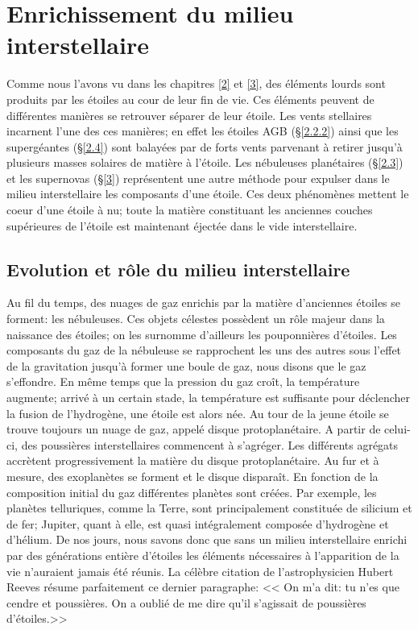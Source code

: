 
\chapterFormats

\chapter{Enrichissement du milieu interstellaire}\label{5}

\chapterFormat

Comme nous l'avons vu dans les chapitres \ref{2} et \ref{3}, des éléments lourds sont produits par les étoiles au cour de leur fin de vie. Ces éléments peuvent de différentes manières se retrouver séparer de leur étoile. Les vents stellaires incarnent l'une des ces manières; en effet les étoiles AGB (§\ref{2.2.2}) ainsi que les supergéantes (§\ref{2.4}) sont balayées par de forts vents parvenant à retirer jusqu'à plusieurs masses solaires de matière à l'étoile. Les nébuleuses planétaires (§\ref{2.3}) et les supernovas (§\ref{3}) représentent une autre méthode pour expulser dans le milieu interstellaire les composants d'une étoile. Ces deux phénomènes mettent le coeur d'une étoile à nu; toute la matière constituant les anciennes couches supérieures de l'étoile est maintenant éjectée dans le vide interstellaire. 

\section{Evolution et rôle du milieu interstellaire}\label{5.1}

Au fil du temps, des nuages de gaz enrichis par la matière d'anciennes étoiles se forment: les nébuleuses. Ces objets célestes possèdent un rôle majeur dans la naissance des étoiles; on les surnomme d'ailleurs les pouponnières d'étoiles. Les composants du gaz de la nébuleuse se rapprochent les uns des autres sous l'effet de la gravitation jusqu'à former une boule de gaz, nous disons que le gaz s'effondre. En même temps que la pression du gaz croît, la température augmente; arrivé à un certain stade, la température est suffisante pour déclencher la fusion de l'hydrogène, une étoile est alors née. Au tour de la jeune étoile se trouve toujours un nuage de gaz, appelé disque protoplanétaire. A partir de celui-ci, des poussières interstellaires commencent à s'agréger. Les différents agrégats accrètent progressivement la matière du disque protoplanétaire. Au fur et à mesure, des exoplanètes se forment et le disque disparaît. En fonction de la composition initial du gaz différentes planètes sont créées. Par exemple, les planètes telluriques, comme la Terre, sont principalement constituée de silicium et de fer; Jupiter, quant à elle, est quasi intégralement composée d'hydrogène et d'hélium. De nos jours, nous savons donc que sans un milieu interstellaire enrichi par des générations entière d'étoiles les éléments nécessaires à l'apparition de la vie n'auraient jamais été réunis. La célèbre citation de l'astrophysicien Hubert Reeves résume parfaitement ce dernier paragraphe: << On m'a dit: tu n'es que cendre et poussières. On a oublié de me dire qu'il s'agissait de poussières d'étoiles.>>

